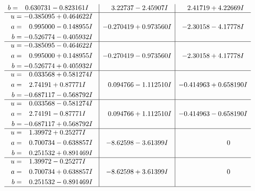 \documentclass[1p]{elsarticle_modified}
\theoremstyle{definition}
\begin{document}
$$\begin{array}{c|c|c}
\begin{aligned}
b &= \phantom{-}0.630731 - 0.823161 I\end{aligned}
 & \phantom{-}3.22737 - 2.45907 I & \phantom{-}2.41719 + 4.22669 I \\ \hline\begin{aligned}
u &= -0.385095 + 0.464622 I \\
a &= \phantom{-}0.995000 - 0.148955 I \\
b &= -0.526774 - 0.405932 I\end{aligned}
 & -0.270419 + 0.973560 I & -2.30158 - 4.17778 I \\ \hline\begin{aligned}
u &= -0.385095 - 0.464622 I \\
a &= \phantom{-}0.995000 + 0.148955 I \\
b &= -0.526774 + 0.405932 I\end{aligned}
 & -0.270419 - 0.973560 I & -2.30158 + 4.17778 I \\ \hline\begin{aligned}
u &= \phantom{-}0.033568 + 0.581274 I \\
a &= \phantom{-}2.74191 + 0.87771 I \\
b &= -0.687117 - 0.568792 I\end{aligned}
 & \phantom{-}0.094766 - 1.112510 I & -0.414963 + 0.658190 I \\ \hline\begin{aligned}
u &= \phantom{-}0.033568 - 0.581274 I \\
a &= \phantom{-}2.74191 - 0.87771 I \\
b &= -0.687117 + 0.568792 I\end{aligned}
 & \phantom{-}0.094766 + 1.112510 I & -0.414963 - 0.658190 I \\ \hline\begin{aligned}
u &= \phantom{-}1.39972 + 0.25277 I \\
a &= \phantom{-}0.700734 - 0.638857 I \\
b &= \phantom{-}0.251532 + 0.891469 I\end{aligned}
 & -8.62598 - 3.61399 I & \phantom{-0.000000 } 0 \\ \hline\begin{aligned}
u &= \phantom{-}1.39972 - 0.25277 I \\
a &= \phantom{-}0.700734 + 0.638857 I \\
b &= \phantom{-}0.251532 - 0.891469 I\end{aligned}
 & -8.62598 + 3.61399 I & \phantom{-0.000000 } 0\\
 \hline 

\end{array}$$
\end{document}
